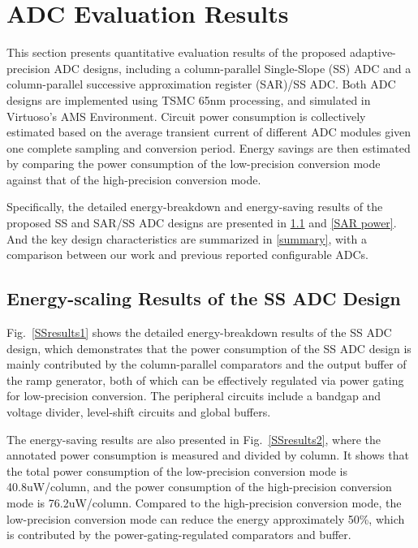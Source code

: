\section{ADC Evaluation Results}\label{result}

This section presents quantitative evaluation results of the proposed adaptive-precision ADC 
designs, including a column-parallel Single-Slope (SS) ADC and a column-parallel successive 
approximation register (SAR)/SS ADC. Both ADC designs are implemented using TSMC 65nm processing,
and simulated in Virtuoso’s AMS Environment. Circuit power consumption is collectively estimated
based on the average transient current of different ADC modules given one complete sampling and 
conversion period. Energy savings are then estimated by comparing the power consumption of the
low-precision conversion mode against that of the high-precision conversion mode. 

Specifically, the detailed energy-breakdown and energy-saving results of the proposed SS and SAR/SS ADC designs are presented in \ref{SS power} and \ref{SAR power}. And the key design characteristics are summarized in \ref{summary}, with a comparison between our work and previous reported configurable ADCs.

\subsection{Energy-scaling Results of the SS ADC Design}\label{SS power}

Fig.~\ref{SSresults1} shows the detailed energy-breakdown results of the SS ADC design,
which demonstrates that the power consumption of the SS ADC design is mainly contributed by 
the column-parallel comparators and the output buffer of the ramp generator, both of which 
can be effectively regulated via power gating for low-precision conversion. The peripheral circuits include a bandgap and voltage divider, level-shift circuits and global buffers.

The energy-saving results are also presented in Fig.~\ref{SSresults2}, where the annotated power consumption is measured and divided by column. It shows that the total power consumption of the low-precision conversion mode is 40.8uW/column, and the power consumption of the high-precision conversion mode is 76.2uW/column. 
Compared to the high-precision conversion mode, the low-precision conversion mode can reduce 
the energy approximately 50\%, which is contributed by the power-gating-regulated comparators and buffer.

